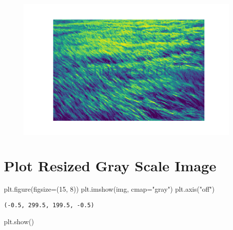 \documentclass[
  letterpaper,
  DIV=11,
  numbers=noendperiod]{scrreprt}
\newenvironment{Shaded}{\begin{snugshade}}{\end{snugshade}}
\newcommand{\DecValTok}[1]{\textcolor[rgb]{0.68,0.00,0.00}{#1}}
\newcommand{\NormalTok}[1]{\textcolor[rgb]{0.00,0.23,0.31}{#1}}
\newcommand{\OperatorTok}[1]{\textcolor[rgb]{0.37,0.37,0.37}{#1}}
\newcommand{\StringTok}[1]{\textcolor[rgb]{0.13,0.47,0.30}{#1}}
\begin{document}
\begin{figure}[H]

{\centering \includegraphics{results_files/figure-pdf/unnamed-chunk-1-1.pdf}

}

\end{figure}

\hypertarget{plot-resized-gray-scale-image}{%
\section{Plot Resized Gray Scale
Image}\label{plot-resized-gray-scale-image}}

\begin{Shaded}
\begin{Highlighting}[]
\NormalTok{plt.figure(figsize}\OperatorTok{=}\NormalTok{(}\DecValTok{15}\NormalTok{, }\DecValTok{8}\NormalTok{))}
\NormalTok{plt.imshow(img, cmap}\OperatorTok{=}\StringTok{"gray"}\NormalTok{)}
\NormalTok{plt.axis(}\StringTok{"off"}\NormalTok{)}
\end{Highlighting}
\end{Shaded}

\begin{verbatim}
(-0.5, 299.5, 199.5, -0.5)
\end{verbatim}

\begin{Shaded}
\begin{Highlighting}[]
\NormalTok{plt.show()}
\end{Highlighting}
\end{Shaded}
\end{document}
